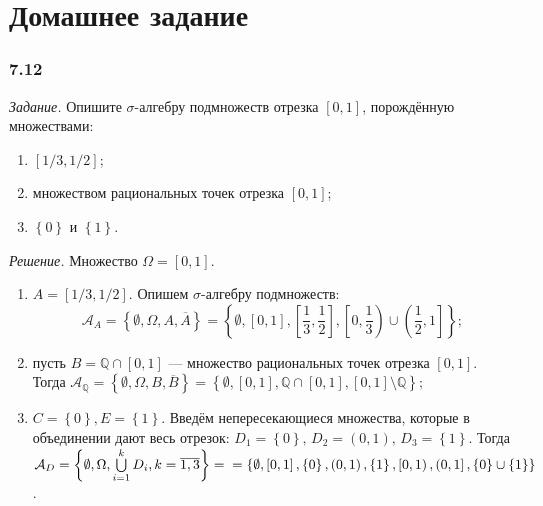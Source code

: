 \section*{Домашнее задание}

\subsubsection*{7.12}

\textit{Задание.} Опишите $ \sigma $-алгебру подмножеств отрезка $ \left[ 0, 1 \right] $, порождённую множествами:
\begin{enumerate}[label=\alph*)]
\item $ \left[ 1/3, 1/2 \right] $;
\item множеством рациональных точек отрезка $ \left[ 0, 1 \right] $;
\item $ \left\{ 0 \right\} $ и $ \left\{ 1 \right\} $.
\end{enumerate}

\textit{Решение.} Множество $ \Omega = \left[ 0, 1 \right] $.

\begin{enumerate}[label=\alph*)]
\item $A = \left[ 1/3, 1/2 \right] $.
Опишем $ \sigma $-алгебру подмножеств:
$$ \mathcal{A}_A =
\left\{ \emptyset, \Omega, A, \overline{A} \right\} =
\left\{ \emptyset, \left[ 0, 1 \right],
\left[ \frac{1}{3}, \frac{1}{2} \right], \left[ 0, \frac{1}{3} \right) \cup \left( \frac{1}{2}, 1 \right] \right\};$$
\item пусть $B = \mathbb{Q} \cap \left[ 0, 1 \right] $ --- множество рациональных точек отрезка $ \left[ 0, 1 \right] $.
Тогда
$ \mathcal{A}_{ \mathbb{Q} } =
\left\{ \emptyset, \Omega, B, \overline{B} \right\} =
\left\{ \emptyset, \left[ 0, 1 \right], \mathbb{Q} \cap \left[ 0, 1 \right], \left[ 0, 1 \right] \setminus \mathbb{Q} \right\};$
\item $C = \left\{ 0 \right\}, E = \left\{ 1 \right\} $.
Введём непересекающиеся множества,
которые в объединении дают весь отрезок: $D_1 = \left\{ 0 \right\}, \, D_2 = \left( 0, 1 \right), \, D_3 = \left\{ 1 \right\} $.
Тогда
$ \mathcal{A}_D =
\left\{ \emptyset, \Omega, \bigcup \limits_{i=1}^k D_i, k = \overline{1, 3} \right\} = \\
= \left\{ \emptyset, \left[0, 1 \right], \left\{ 0 \right\}, \left( 0, 1 \right),
\left\{ 1 \right\}, \left[0, 1 \right), \left(0, 1 \right], \left\{ 0 \right\} \cup \left\{ 1 \right\} \right\} $.
\end{enumerate}

